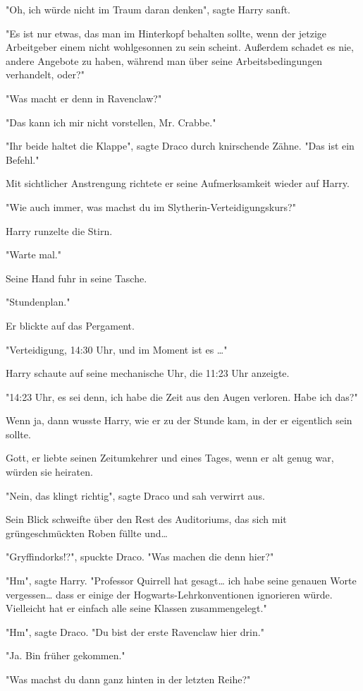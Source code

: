 {"Oh, ich würde nicht im Traum daran denken", sagte Harry sanft.

"Es ist nur etwas, das man im Hinterkopf behalten sollte, wenn der jetzige Arbeitgeber einem nicht wohlgesonnen zu sein scheint. Außerdem schadet es nie, andere Angebote zu haben, während man über seine Arbeitsbedingungen verhandelt, oder?"

"Was macht er denn in Ravenclaw?"

"Das kann ich mir nicht vorstellen, Mr. Crabbe."

"Ihr beide haltet die Klappe", sagte Draco durch knirschende Zähne. "Das ist ein Befehl."

Mit sichtlicher Anstrengung richtete er seine Aufmerksamkeit wieder auf Harry.

"Wie auch immer, was machst du im Slytherin-Verteidigungskurs?"

Harry runzelte die Stirn.

"Warte mal."

Seine Hand fuhr in seine Tasche.

"Stundenplan."

Er blickte auf das Pergament.

"Verteidigung, 14:30 Uhr, und im Moment ist es …"

Harry schaute auf seine mechanische Uhr, die 11:23 Uhr anzeigte.

"14:23 Uhr, es sei denn, ich habe die Zeit aus den Augen verloren. Habe ich das?"

Wenn ja, dann wusste Harry, wie er zu der Stunde kam, in der er eigentlich sein sollte.

Gott, er liebte seinen Zeitumkehrer und eines Tages, wenn er alt genug war, würden sie heiraten.

"Nein, das klingt richtig", sagte Draco und sah verwirrt aus.

Sein Blick schweifte über den Rest des Auditoriums, das sich mit grüngeschmückten Roben füllte und…

"Gryffindorks!?", spuckte Draco. "Was machen die denn hier?"

"Hm", sagte Harry. "Professor Quirrell hat gesagt… ich habe seine genauen Worte vergessen… dass er einige der Hogwarts-Lehrkonventionen ignorieren würde. Vielleicht hat er einfach alle seine Klassen zusammengelegt."

"Hm", sagte Draco. "Du bist der erste Ravenclaw hier drin."

"Ja. Bin früher gekommen."

"Was machst du dann ganz hinten in der letzten Reihe?"

}
